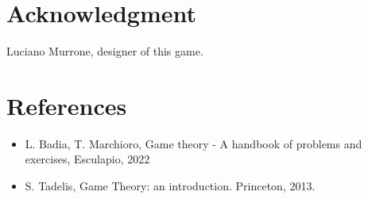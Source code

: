 \documentclass[conference]{IEEEtran}
\begin{document}
\section*{Acknowledgment}
Luciano Murrone, designer of this game.

\section*{References}
\begin{itemize}
    \item L. Badia, T. Marchioro, Game theory - A handbook of problems and exercises, Esculapio, 2022
    \item S. Tadelis, Game Theory: an introduction. Princeton, 2013.
\end{itemize}
\end{document}
